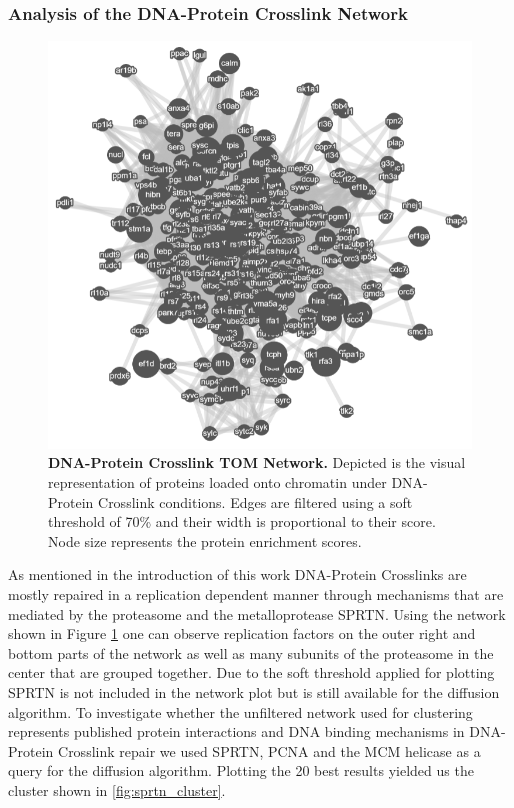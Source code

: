 \subsubsection{Analysis of the DNA-Protein Crosslink Network}
\label{sec:dpcnet}
\begin{figure}[H]
    \centering
    \includegraphics[width=.6\textwidth]{resources/images/Results/DPC_networkplot.png}
    \caption[DNA-Protein Crosslink TOM Network]{\textbf{DNA-Protein Crosslink TOM Network. }Depicted is the visual representation of proteins loaded onto chromatin under DNA-Protein Crosslink conditions. Edges are filtered using a soft threshold of 70\% and their width  is proportional to their score. Node size represents the protein enrichment scores.}
    \label{fig:DPCtom}
\end{figure}
As mentioned in the introduction of this work DNA-Protein Crosslinks are mostly repaired in a replication dependent manner through mechanisms that are mediated by the proteasome and the metalloprotease SPRTN. Using the network shown in Figure \ref{fig:DPCtom} one can observe replication factors on the outer right and bottom parts of the network as well as many subunits of the proteasome in the center that are grouped together. Due to the soft threshold applied for plotting SPRTN is not included in the network plot but is still available for the diffusion algorithm. To investigate whether the unfiltered network used for clustering represents published protein interactions and DNA binding mechanisms in DNA-Protein Crosslink repair we used SPRTN, PCNA and the MCM helicase as a query for the diffusion algorithm. Plotting the 20 best results yielded us the cluster shown in \ref{fig:sprtn_cluster}.\\
